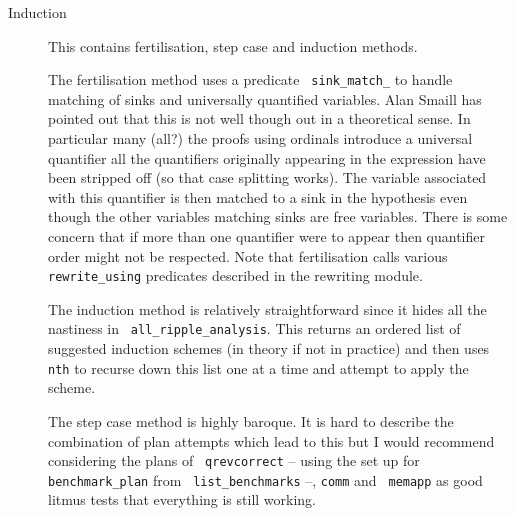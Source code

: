 \begin{description}
\item[Induction]  This contains
  fertilisation, 
  step case and induction
  methods.  
  
  The fertilisation method uses a predicate {\tt
    sink\_match\_} to handle matching of sinks
  and universally quantified variables.  Alan Smaill has pointed out
  that this is not well though out in a theoretical sense.  In
  particular many (all?) the proofs using ordinals
  introduce a universal quantifier all the quantifiers originally
  appearing in the expression have been stripped off (so that case
  splitting works).  The variable associated with this quantifier is
  then matched to a sink in the hypothesis even though the other
  variables matching sinks are free variables.  There is some concern
  that if more than one quantifier were to appear then quantifier
  order might not be respected.  Note that fertilisation calls various
  {\tt rewrite\_using} predicates described in
  the rewriting module.
  
  The induction method is relatively
  straightforward since it hides all the nastiness in {\tt
    all\_ripple\_analysis}.  This returns
  an ordered list of suggested induction schemes (in theory if not in
  practice) and then uses {\tt nth} to recurse down this
  list one at a time and attempt to apply the scheme.
  
  The step case method is highly baroque.  It
  is hard to describe the combination of plan attempts which lead to
  this but I would recommend considering the plans of {\tt
    qrevcorrect} -- using the set up for {\tt
    benchmark\_plan} from {\tt
    list\_benchmarks} --, {\tt comm} and {\tt
    memapp} as good litmus tests that everything is still working.
  

\end{description}

